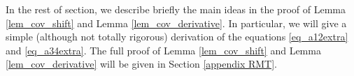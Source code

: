 

In the rest of section, we describe briefly the main ideas in the proof of Lemma \ref{lem_cov_shift} and Lemma \ref{lem_cov_derivative}. In particular, we will give a simple (although not totally rigorous) derivation of the equations \eqref{eq_a12extra} and \eqref{eq_a34extra}.
The full proof of Lemma \ref{lem_cov_shift} and Lemma \ref{lem_cov_derivative} will be given in Section \ref{appendix RMT}.



